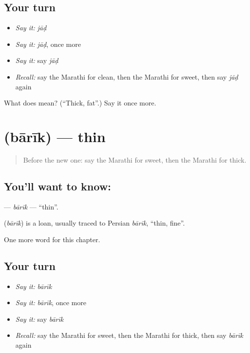 \subsection*{Your turn}
\begin{itemize}
\raggedright
  \item \emph{Say it:} \emph{jāḍ}
  \item \emph{Say it:} \emph{jāḍ}, once more
  \item \emph{Say it:} say \emph{jāḍ}
  \item \emph{Recall:} say the Marathi for clean, then the Marathi for sweet, then say \emph{jāḍ} again
\end{itemize}

\begin{tcolorbox}[breakable,colback=teal!4,colframe=teal!35!black,title={Before you move on}]
What does  mean? (\textquotedblleft{}Thick, fat\textquotedblright{}.) Say it once more.
\end{tcolorbox}
\section[\texorpdfstring{\mr{बारीक} (bārīk)}{बारीक (bārīk)}]{ (bārīk) — thin}

\label{lesson:MR-C106-barik}



\begin{quote}
Before the new one: say the Marathi for sweet, then the Marathi for thick.
\end{quote}

\subsection*{You'll want to know: }
\textbf{} — \emph{bārīk} — \textquotedblleft{}thin\textquotedblright{}.

\begin{cousinweb}
\textbf{} (\emph{bārīk}) is a loan, usually traced to Persian \emph{bārīk}, \textquotedblleft{}thin, fine\textquotedblright{}.
\end{cousinweb}

\begin{grammarlens}[title={What you've built}]
One more word for this chapter.
\end{grammarlens}

\subsection*{Your turn}
\begin{itemize}
\raggedright
  \item \emph{Say it:} \emph{bārīk}
  \item \emph{Say it:} \emph{bārīk}, once more
  \item \emph{Say it:} say \emph{bārīk}
  \item \emph{Recall:} say the Marathi for sweet, then the Marathi for thick, then say \emph{bārīk} again
\end{itemize}

